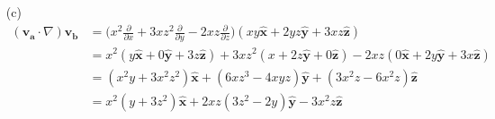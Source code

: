 \documentclass[a4paper,12pt]{article}
\newcommand{\printingbibliography}{%

    \pagestyle{myheadings}
    \markright{}
    \sloppy
    \printbibliography[heading=bibintoc, %
                   title=Refer\^encias %
                  ]
    \fussy%
}
\begin{document}
\begin{enumerate}
    \item[(c)]
    \begin{align}
        (\mathbf{v_a} \cdot \nabla) \mathbf{v_b} &= \Big(x^2 \frac{\partial}{\partial x} + 3x z^2 \frac{\partial}{\partial y} - 2xz \frac{\partial}{\partial z}\Big) (xy \hat{\mathbf{x}} + 2yz \hat{\mathbf{y}} + 3xz \hat{\mathbf{z}})\\
        &= x^2 (y \hat{\mathbf{x}} + 0 \hat{\mathbf{y}} + 3z \hat{\mathbf{z}}) + 3x z^2 (x + 2z \hat{\mathbf{y}} + 0 \hat{\mathbf{z}}) - 2xz (0 \hat{\mathbf{x}} + 2y \hat{\mathbf{y}} + 3x \hat{\mathbf{z}})\\
        &= (x^2 y + 3x^2 z^2) \hat{\mathbf{x}} + (6xz^3 - 4xyz) \hat{\mathbf{y}} + (3x^2 z - 6x^2 z) \hat{\mathbf{z}}\\
        &= \boxed{x^2 (y + 3z^2)\hat{\mathbf{x}} + 2xz (3z^2 - 2y) \hat{\mathbf{y}} - 3x^2 z \hat{\mathbf{z}}}
        \end{align}

\end{enumerate}


   
    

\end{document}
